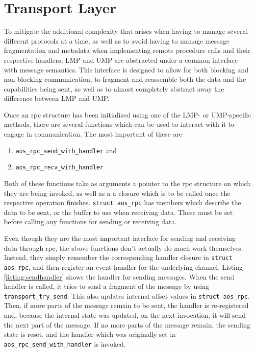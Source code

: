 \section{Transport Layer}
To mitigate the additional complexity that arises when having to manage several different protocols at a time, as well as to avoid having to manage message fragmentation and metadata when implementing remote procedure calls and their respective handlers, LMP and UMP are abstracted under a common interface with message semantics. This interface is designed to allow for both blocking and non-blocking communication, to fragment and reassemble both the data and the capabilities being sent, as well as to almost completely abstract away the difference between LMP and UMP.

Once an rpc structure has been initialized using one of the LMP- or UMP-specific methods, there are several functions which can be used to interact with it to engage in communication.
The most important of these are 
\begin{enumerate}
    \item \texttt{aos\_rpc\_send\_with\_handler} and
    \item \texttt{aos\_rpc\_recv\_with\_handler}
\end{enumerate}
Both of these functions take as arguments a pointer to the rpc structure on which they are being invoked, as well as a a closure which is to be called once the respective operation finishes. \texttt{struct aos\_rpc} has members which describe the data to be sent, or the buffer to use when receiving data. These must be set before calling any functions for sending or receiving data.

Even though they are the most important interface for sending and receiving data through rpc, the above functions don't actually do much work themselves. Instead, they simply remember the corresponding handler closure in \texttt{struct aos\_rpc}, and then register an event handler for the underlying channel. Listing \ref{listing:sendhandler} shows the handler for sending messages. When the send handler is called, it tries to send a fragment of the message by using \texttt{transport\_try\_send}. This also updates internal offset values in \texttt{struct aos\_rpc}. Then, if more parts of the message remain to be sent, the handler is re-registered and, because the internal state was updated, on the next invocation, it will send the next part of the message. If no more parts of the message remain, the sending state is reset, and the handler which was originally set in \texttt{aos\_rpc\_send\_with\_handler} is invoked.

